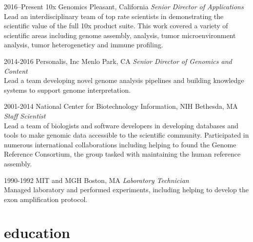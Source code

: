 \documentclass[]{dmc-cv} %
\begin{document}
\begin{entrylist}


\entry
{2016--Present}
{10x Genomics}
{Pleasant, California}
{\emph{Senior Director of Applications} \\
Lead an interdisciplinary team of top rate scientists in demonstrating the scientific value of the full
10x product suite. This work covered a variety of scientific areas including genome assembly, analysis,
tumor microenvironment analysis, tumor heterogeneticy and immune profiling.
}

\entry
{2014-2016}
{Personalis, Inc}
{Menlo Park, CA}
{\emph{Senior Director of Genomics and Content} \\
Lead a team developing novel genome analysis pipelines and building knowledge systems to support genome interpretation.
}

\entry
{2001-2014}
{National Center for Biotechnology Information, NIH}
{Bethesda, MA}
{\emph{Staff Scientist} \\
Lead a team of biologists and software developers in developing databases and tools to make genomic data accessible to the scientific community. Participated in numerous international collaborations including helping to found the Genome Reference Consortium, the group tasked with maintaining the human reference assembly.
}

\entry
{1990-1992}
{MIT and MGH}
{Boston, MA}
{\emph{Laboratory Technician}\\
Managed laboratory and performed experiments, including helping to develop the exon amplification protocol.
}

\end{entrylist}


\section{education}
\end{document}
